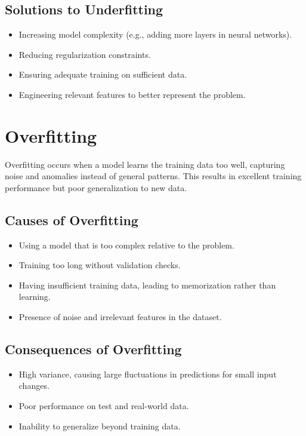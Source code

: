\documentclass[conference]{IEEEtran}
\begin{document}
\subsection{Solutions to Underfitting}
\begin{itemize}
    \item Increasing model complexity (e.g., adding more layers in neural networks).
    \item Reducing regularization constraints.
    \item Ensuring adequate training on sufficient data.
    \item Engineering relevant features to better represent the problem.
\end{itemize}

\section{Overfitting}
Overfitting occurs when a model learns the training data too well, capturing noise and anomalies instead of general patterns. This results in excellent training performance but poor generalization to new data.

\subsection{Causes of Overfitting}
\begin{itemize}
    \item Using a model that is too complex relative to the problem.
    \item Training too long without validation checks.
    \item Having insufficient training data, leading to memorization rather than learning.
    \item Presence of noise and irrelevant features in the dataset.
\end{itemize}

\subsection{Consequences of Overfitting}
\begin{itemize}
    \item High variance, causing large fluctuations in predictions for small input changes.
    \item Poor performance on test and real-world data.
    \item Inability to generalize beyond training data.
\end{itemize}
\end{document}

